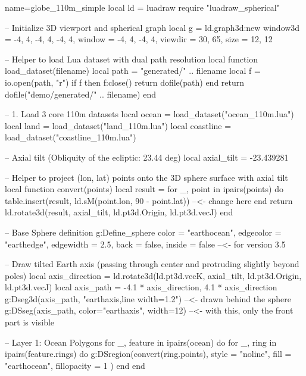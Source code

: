 \documentclass{standalone}
\begin{document}
\begin{luadraw}{name=globe_110m_simple}
    local ld = luadraw
    require "luadraw_spherical"

    -- Initialize 3D viewport and spherical graph
    local g = ld.graph3d:new{
        window3d = {-4, 4, -4, 4, -4, 4},
        window = {-4, 4, -4, 4},
        viewdir = {30, 65},
        size = {12, 12}
    }

    -- Helper to load Lua dataset with dual path resolution
    local function load_dataset(filename)
        local path = "generated/" .. filename
        local f = io.open(path, "r")
        if f then
            f:close()
            return dofile(path)
        end
        return dofile("demo/generated/" .. filename)
    end

    -- 1. Load 3 core 110m datasets
    local ocean = load_dataset("ocean_110m.lua")
    local land = load_dataset("land_110m.lua")
    local coastline = load_dataset("coastline_110m.lua")

    -- Axial tilt (Obliquity of the ecliptic: 23.44 deg)
    local axial_tilt = -23.439281

    -- Helper to project (lon, lat) points onto the 3D sphere surface with axial tilt
    local function convert(points)
        local result = {}
        for _, point in ipairs(points) do
            table.insert(result, ld.sM(point.lon, 90 - point.lat)) --<- change here
        end
        return ld.rotate3d(result, axial_tilt, {ld.pt3d.Origin, ld.pt3d.vecJ})
    end

    -- Base Sphere definition
    g:Define_sphere{
        color = "earthocean",
        edgecolor = "earthedge",
        edgewidth = 2.5,
        back = false, inside = false --<- for version 3.5
    }

    -- Draw tilted Earth axis (passing through center and protruding slightly beyond poles)
    local axis_direction = ld.rotate3d(ld.pt3d.vecK, axial_tilt, {ld.pt3d.Origin, ld.pt3d.vecJ})
    local axis_path = {-4.1 * axis_direction, 4.1 * axis_direction}
    g:Dseg3d(axis_path, "earthaxis,line width=1.2") --<- drawn behind the sphere
    g:DSseg(axis_path, {color="earthaxis", width=12}) --<- with this, only the front part is visible

    -- Layer 1: Ocean Polygons
    for _, feature in ipairs(ocean) do
        for _, ring in ipairs(feature.rings) do
            g:DSregion(convert(ring.points), {
                style = "noline",
                fill = "earthocean",
                fillopacity = 1
            })
        end
    end


\end{luadraw}
\end{document}
